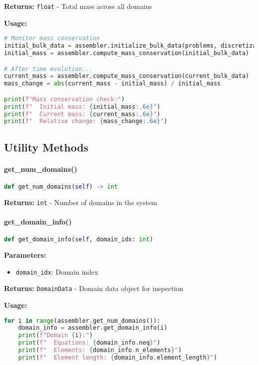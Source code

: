 \textbf{Returns:} \texttt{float} - Total mass across all domains

\textbf{Usage:}
\begin{lstlisting}[language=Python, caption=Mass Conservation Usage]
# Monitor mass conservation
initial_bulk_data = assembler.initialize_bulk_data(problems, discretizations, time=0.0)
initial_mass = assembler.compute_mass_conservation(initial_bulk_data)

# After time evolution...
current_mass = assembler.compute_mass_conservation(current_bulk_data)
mass_change = abs(current_mass - initial_mass) / initial_mass

print(f"Mass conservation check:")
print(f"  Initial mass: {initial_mass:.6e}")
print(f"  Current mass: {current_mass:.6e}")
print(f"  Relative change: {mass_change:.6e}")
\end{lstlisting}

\subsection{Utility Methods}
\label{subsec:utility_methods}

\paragraph{get\_num\_domains()}\leavevmode
\begin{lstlisting}[language=Python, caption=Get Number of Domains Method]
def get_num_domains(self) -> int
\end{lstlisting}

\textbf{Returns:} \texttt{int} - Number of domains in the system

\paragraph{get\_domain\_info()}\leavevmode
\begin{lstlisting}[language=Python, caption=Get Domain Info Method]
def get_domain_info(self, domain_idx: int)
\end{lstlisting}

\textbf{Parameters:}
\begin{itemize}
    \item \texttt{domain\_idx}: Domain index
\end{itemize}

\textbf{Returns:} \texttt{DomainData} - Domain data object for inspection

\textbf{Usage:}
\begin{lstlisting}[language=Python, caption=Domain Info Usage]
for i in range(assembler.get_num_domains()):
    domain_info = assembler.get_domain_info(i)
    print(f"Domain {i}:")
    print(f"  Equations: {domain_info.neq}")
    print(f"  Elements: {domain_info.n_elements}")
    print(f"  Element length: {domain_info.element_length}")
\end{lstlisting}

